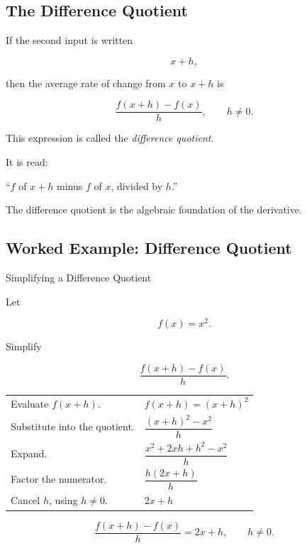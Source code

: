\subsection{The Difference Quotient}
\label{subsec:difference-quotient-precalc}

If the second input is written

\[ x+h, \]

then the average rate of change from \(x\) to \(x+h\) is

\[ \frac{f(x+h)-f(x)}{h},\qquad h\neq0. \]

This expression is called the \emph{difference quotient}.

It is read:

``\(f\) of \(x+h\) minus \(f\) of \(x\), divided by \(h\).''

The difference quotient is the algebraic foundation of the derivative.

\subsection{Worked Example: Difference Quotient}
\label{subsec:worked-difference-quotient}

\begin{workedexamplebox}{Simplifying a Difference Quotient}

Let

\[ f(x)=x^2. \]

Simplify

\[ \frac{f(x+h)-f(x)}{h}. \]

\begin{tabularx}{\textwidth}{@{}>{\raggedright\arraybackslash}p{}X@{}}
Evaluate \(f(x+h)\). &
\(f(x+h)=(x+h)^2\)\\
Substitute into the quotient. &
\(\dfrac{(x+h)^2-x^2}{h}\)\\
Expand. &
\(\dfrac{x^2+2xh+h^2-x^2}{h}\)\\
Factor the numerator. &
\(\dfrac{h(2x+h)}{h}\)\\
Cancel \(h\), using \(h\neq0\). &
\(2x+h\)
\end{tabularx}

\begin{answerbox}
\[ \boxed{\frac{f(x+h)-f(x)}{h}=2x+h,\qquad h\neq0.} \]
\end{answerbox}
\end{workedexamplebox}

